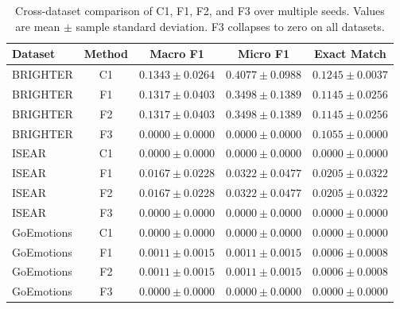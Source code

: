 \begin{table}[htbp]
\centering
\caption{Cross-dataset comparison of C1, F1, F2, and F3 over multiple seeds. 
Values are mean \(\pm\) sample standard deviation. F3 collapses to zero on all datasets.}
\begin{tabular}{|l|c|c|c|c|}
\hline
\textbf{Dataset} & \textbf{Method} & \textbf{Macro F1} & \textbf{Micro F1} & \textbf{Exact Match} \\
\hline
BRIGHTER & C1 & $0.1343 \pm 0.0264$ & $0.4077 \pm 0.0988$ & $0.1245 \pm 0.0037$ \\
BRIGHTER & F1 & $0.1317 \pm 0.0403$ & $0.3498 \pm 0.1389$ & $0.1145 \pm 0.0256$ \\
BRIGHTER & F2 & $0.1317 \pm 0.0403$ & $0.3498 \pm 0.1389$ & $0.1145 \pm 0.0256$ \\
BRIGHTER & F3 & $0.0000 \pm 0.0000$ & $0.0000 \pm 0.0000$ & $0.1055 \pm 0.0000$ \\
ISEAR & C1 & $0.0000 \pm 0.0000$ & $0.0000 \pm 0.0000$ & $0.0000 \pm 0.0000$ \\
ISEAR & F1 & $0.0167 \pm 0.0228$ & $0.0322 \pm 0.0477$ & $0.0205 \pm 0.0322$ \\
ISEAR & F2 & $0.0167 \pm 0.0228$ & $0.0322 \pm 0.0477$ & $0.0205 \pm 0.0322$ \\
ISEAR & F3 & $0.0000 \pm 0.0000$ & $0.0000 \pm 0.0000$ & $0.0000 \pm 0.0000$ \\
GoEmotions & C1 & $0.0000 \pm 0.0000$ & $0.0000 \pm 0.0000$ & $0.0000 \pm 0.0000$ \\
GoEmotions & F1 & $0.0011 \pm 0.0015$ & $0.0011 \pm 0.0015$ & $0.0006 \pm 0.0008$ \\
GoEmotions & F2 & $0.0011 \pm 0.0015$ & $0.0011 \pm 0.0015$ & $0.0006 \pm 0.0008$ \\
GoEmotions & F3 & $0.0000 \pm 0.0000$ & $0.0000 \pm 0.0000$ & $0.0000 \pm 0.0000$ \\
\hline
\end{tabular}
\label{tab:cross_dataset}
\end{table}
